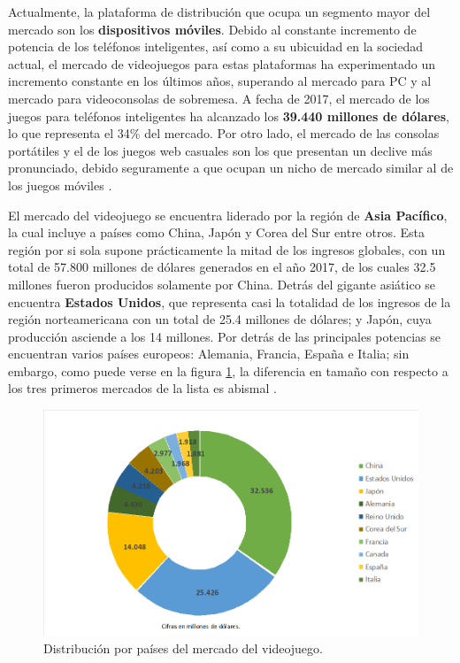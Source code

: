 Actualmente, la plataforma de distribución que ocupa un segmento mayor del mercado son los \textbf{dispositivos móviles}. Debido al constante incremento de potencia de los teléfonos inteligentes, así como a su ubicuidad en la sociedad actual, el mercado de videojuegos para estas plataformas ha experimentado un incremento constante en los últimos años, superando al mercado para PC y al mercado para videoconsolas de sobremesa. A fecha de 2017, el mercado de los juegos para teléfonos inteligentes ha alcanzado los \textbf{39.440 millones de dólares}, lo que representa el 34\% del mercado. Por otro lado, el mercado de las consolas portátiles y el de los juegos web casuales son los que presentan un declive más pronunciado, debido seguramente a que ocupan un nicho de mercado similar al de los juegos móviles \cite{libro_blanco}.

El mercado del videojuego se encuentra liderado por la región de \textbf{Asia Pacífico}, la cual incluye a países como China, Japón y Corea del Sur entre otros. Esta región por si sola supone prácticamente la mitad de los ingresos globales, con un total de 57.800 millones de dólares generados en el año 2017, de los cuales 32.5 millones fueron producidos solamente por China. Detrás del gigante asiático se encuentra \textbf{Estados Unidos}, que representa casi la totalidad de los ingresos de la región norteamericana con un total de 25.4 millones de dólares; y Japón, cuya producción asciende a los 14 millones. Por detrás de las principales potencias se encuentran varios países europeos: Alemania, Francia, España e Italia; sin embargo, como puede verse en la figura \ref{distribucion-mercado-mundial}, la diferencia en tamaño con respecto a los tres primeros mercados de la lista es abismal \cite{libro_blanco}.
\begin{figure}[!t]
    \centering
    \includegraphics[width=1\textwidth]{images/estadodelarte/mercado/10-mayores-mercados}
    \caption{Distribución por países del mercado del videojuego.}
    \label{distribucion-mercado-mundial}
\end{figure}

